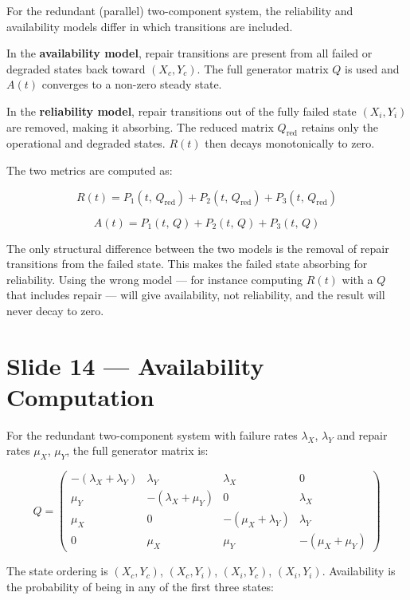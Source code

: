 For the redundant (parallel) two-component system, the reliability 
and availability models differ in which transitions are included.

In the \textbf{availability model}, repair transitions are present 
from all failed or degraded states back toward $(X_c, Y_c)$. The 
full generator matrix $Q$ is used and $A(t)$ converges to a 
non-zero steady state.

In the \textbf{reliability model}, repair transitions out of the 
fully failed state $(X_i, Y_i)$ are removed, making it absorbing. 
The reduced matrix $Q_{\mathrm{red}}$ retains only the operational 
and degraded states. $R(t)$ then decays monotonically to zero.

The two metrics are computed as:

\[
    R(t) = P_1(t,\, Q_{\mathrm{red}}) + P_2(t,\, Q_{\mathrm{red}}) 
    + P_3(t,\, Q_{\mathrm{red}})
\]

\[
    A(t) = P_1(t,\, Q) + P_2(t,\, Q) + P_3(t,\, Q)
\]

\begin{warnbox}
    The only structural difference between the two models is the 
    removal of repair transitions from the failed state. This makes 
    the failed state absorbing for reliability. Using the wrong model 
    --- for instance computing $R(t)$ with a $Q$ that includes repair 
    --- will give availability, not reliability, and the result will 
    never decay to zero.
\end{warnbox}

\section*{Slide 14 — Availability Computation}

For the redundant two-component system with failure rates $\lambda_X$, 
$\lambda_Y$ and repair rates $\mu_X$, $\mu_Y$, the full generator 
matrix is:

\[
Q = \begin{pmatrix}
-(\lambda_X + \lambda_Y) & \lambda_Y & \lambda_X & 0 \\
\mu_Y & -(\lambda_X + \mu_Y) & 0 & \lambda_X \\
\mu_X & 0 & -(\mu_X + \lambda_Y) & \lambda_Y \\
0 & \mu_X & \mu_Y & -(\mu_X + \mu_Y)
\end{pmatrix}
\]

The state ordering is $(X_c, Y_c)$, $(X_c, Y_i)$, $(X_i, Y_c)$, 
$(X_i, Y_i)$. Availability is the probability of being in any of 
the first three states:

